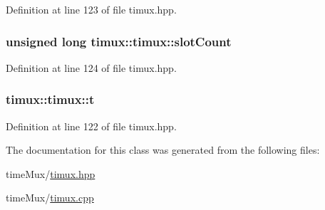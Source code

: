 Definition at line 123 of file timux.\+hpp.

\hypertarget{classtimux_1_1timux_a3c8195dcabf2a776759b09f66e08bc80}{
\subsubsection[{slot\+Count}]{\setlength{\rightskip}{0pt plus 5cm}unsigned long timux\+::timux\+::slot\+Count}}\label{classtimux_1_1timux_a3c8195dcabf2a776759b09f66e08bc80}


Definition at line 124 of file timux.\+hpp.

\hypertarget{classtimux_1_1timux_a880a260ad67a47cbdbbd756a42ea0e48}{
\subsubsection[{t}]{ timux\+::timux\+::t}}\label{classtimux_1_1timux_a880a260ad67a47cbdbbd756a42ea0e48}


Definition at line 122 of file timux.\+hpp.



The documentation for this class was generated from the following files\+:\begin{DoxyCompactItemize}
\item 
time\+Mux/\hyperlink{timux_8hpp}{timux.\+hpp}\item 
time\+Mux/\hyperlink{timux_8cpp}{timux.\+cpp}\end{DoxyCompactItemize}
